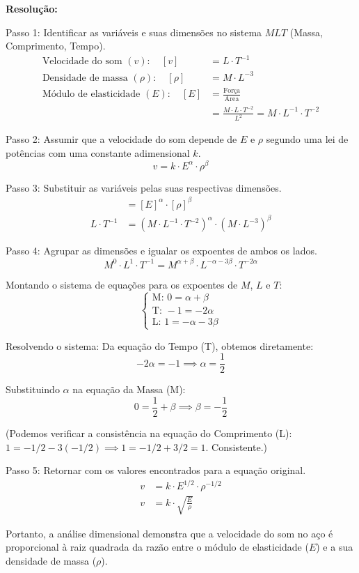 \noindent\textbf{Resolução:}

Passo 1: Identificar as variáveis e suas dimensões no sistema $MLT$ (Massa, Comprimento, Tempo).
\begin{align*}
\text{Velocidade do som } (v): \quad [v] &= L \cdot T^{-1} \\
\text{Densidade de massa } (\rho): \quad [\rho] &= M \cdot L^{-3} \\
\text{Módulo de elasticidade } (E): \quad [E] &= \frac{\text{Força}}{\text{Área}} \\
&= \frac{M \cdot L \cdot T^{-2}}{L^2} = M \cdot L^{-1} \cdot T^{-2}
\end{align*}

Passo 2: Assumir que a velocidade do som depende de $E$ e $\rho$ segundo uma lei de potências com uma constante adimensional $k$.
\[ v = k \cdot E^\alpha \cdot \rho^\beta \]

Passo 3: Substituir as variáveis pelas suas respectivas dimensões.
\begin{align*}
[v] &= [E]^\alpha \cdot [\rho]^\beta \\
L \cdot T^{-1} &= (M \cdot L^{-1} \cdot T^{-2})^\alpha \cdot (M \cdot L^{-3})^\beta
\end{align*}

Passo 4: Agrupar as dimensões e igualar os expoentes de ambos os lados.
\[ M^0 \cdot L^1 \cdot T^{-1} = M^{\alpha+\beta} \cdot L^{-\alpha-3\beta} \cdot T^{-2\alpha} \]

Montando o sistema de equações para os expoentes de $M$, $L$ e $T$:
\[
\begin{cases}
\text{M: } 0 = \alpha + \beta \\
\text{T: } -1 = -2\alpha \\
\text{L: } 1 = -\alpha - 3\beta
\end{cases}
\]

Resolvendo o sistema:
Da equação do Tempo (T), obtemos diretamente:
\[ -2\alpha = -1 \implies \alpha = \frac{1}{2} \]

Substituindo $\alpha$ na equação da Massa (M):
\[ 0 = \frac{1}{2} + \beta \implies \beta = -\frac{1}{2} \]

(Podemos verificar a consistência na equação do Comprimento (L): $1 = -1/2 - 3(-1/2) \implies 1 = -1/2 + 3/2 = 1$. Consistente.)

Passo 5: Retornar com os valores encontrados para a equação original.
\begin{align*}
v &= k \cdot E^{1/2} \cdot \rho^{-1/2} \\
v &= k \cdot \sqrt{\frac{E}{\rho}}
\end{align*}

Portanto, a análise dimensional demonstra que a velocidade do som no aço é proporcional à raiz quadrada da razão entre o módulo de elasticidade ($E$) e a sua densidade de massa ($\rho$).